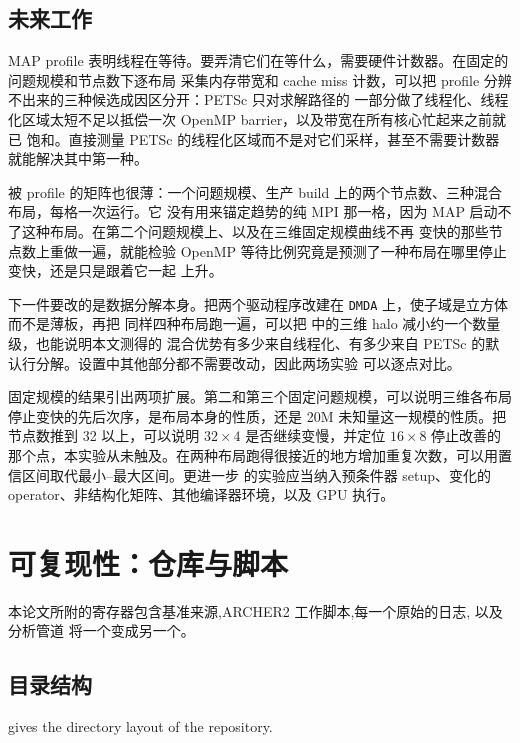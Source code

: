 \documentclass[11pt,a4paper,oneside]{report}
\begin{document}
\section{未来工作}
\label{sec:futurework}
MAP profile 表明线程在等待。要弄清它们在等什么，需要硬件计数器。在固定的问题规模和节点数下逐布局
采集内存带宽和 cache miss 计数，可以把 profile 分辨不出来的三种候选成因区分开：PETSc 只对求解路径的
一部分做了线程化、线程化区域太短不足以抵偿一次 OpenMP barrier，以及带宽在所有核心忙起来之前就已
饱和。直接测量 PETSc 的线程化区域而不是对它们采样，甚至不需要计数器就能解决其中第一种。

被 profile 的矩阵也很薄：一个问题规模、生产 build 上的两个节点数、三种混合布局，每格一次运行。它
没有用来锚定趋势的纯 MPI 那一格，因为 MAP 启动不了这种布局。在第二个问题规模上、以及在三维固定规模曲线不再
变快的那些节点数上重做一遍，就能检验 OpenMP 等待比例究竟是预测了一种布局在哪里停止变快，还是只是跟着它一起
上升。

下一件要改的是数据分解本身。把两个驱动程序改建在 \texttt{DMDA} 上，使子域是立方体而不是薄板，再把
同样四种布局跑一遍，可以把  中的三维 halo 减小约一个数量级，也能说明本文测得的
混合优势有多少来自线程化、有多少来自 PETSc 的默认行分解。设置中其他部分都不需要改动，因此两场实验
可以逐点对比。

固定规模的结果引出两项扩展。第二和第三个固定问题规模，可以说明三维各布局停止变快的先后次序，是布局本身的性质，还是 20M
未知量这一规模的性质。把节点数推到 32 以上，可以说明 $32\times4$ 是否继续变慢，并定位 $16\times8$ 停止改善的那个点，本实验从未触及。在两种布局跑得很接近的地方增加重复次数，可以用置信区间取代最小--最大区间。更进一步
的实验应当纳入预条件器 setup、变化的 operator、非结构化矩阵、其他编译器环境，以及 GPU 执行。


\printbibliography[heading=bibintoc]

\appendix

\chapter{可复现性：仓库与脚本}
\label{app:repo}
本论文所附的寄存器包含基准来源,ARCHER2
工作脚本,每一个原始的日志, 以及分析管道 将一个变成另一个。

\section{目录结构}
\label{app:layout}
 gives the directory layout of the repository.
\end{document}
